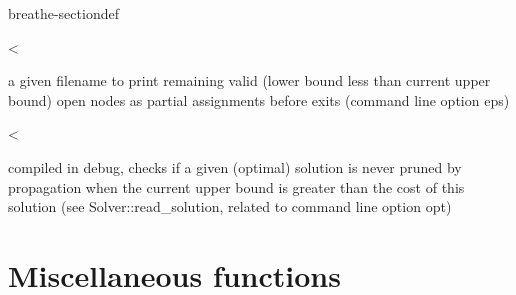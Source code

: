 \documentclass[letterpaper,10pt,openany,oneside,english]{sphinxmanual}
\begin{document}
\begin{fulllineitems}
\begin{sphinxuseclass}{breathe-sectiondef}
\begin{fulllineitems}
\label{\detokenize{ref/ref_cpp:_CPPv4N8ToulBar29verifyOptE}}\label{\detokenize{ref/ref_cpp:_CPPv3N8ToulBar29verifyOptE}}\label{\detokenize{ref/ref_cpp:_CPPv2N8ToulBar29verifyOptE}}\label{\detokenize{ref/ref_cpp:ToulBar2::verifyOpt__b}}
\pysigstartsignatures
\pysigstartmultiline
{}
\pysigstopmultiline
\pysigstopsignatures
\sphinxAtStartPar
\textless{} 

\sphinxAtStartPar
a given filename to print remaining valid (lower bound less than current upper bound) open nodes as partial assignments before exits (command line option \sphinxhyphen{}eps) 

\end{fulllineitems}


\begin{fulllineitems}
\label{\detokenize{ref/ref_cpp:_CPPv4N8ToulBar215verifiedOptimumE}}\label{\detokenize{ref/ref_cpp:_CPPv3N8ToulBar215verifiedOptimumE}}\label{\detokenize{ref/ref_cpp:_CPPv2N8ToulBar215verifiedOptimumE}}\label{\detokenize{ref/ref_cpp:ToulBar2::verifiedOptimum__Cost}}
\pysigstartsignatures
\pysigstartmultiline
{}
\pysigstopmultiline
\pysigstopsignatures
\sphinxAtStartPar
\textless{} 

\sphinxAtStartPar
compiled in debug, checks if a given (optimal) solution is never pruned by propagation when the current upper bound is greater than the cost of this solution (see Solver::read\_solution, related to command line option \sphinxhyphen{}opt) 

\end{fulllineitems}


\end{sphinxuseclass}
\end{fulllineitems}



\chapter{Miscellaneous functions}
\label{\detokenize{ref/ref_cpp:miscellaneous-functions}}
\end{document}
